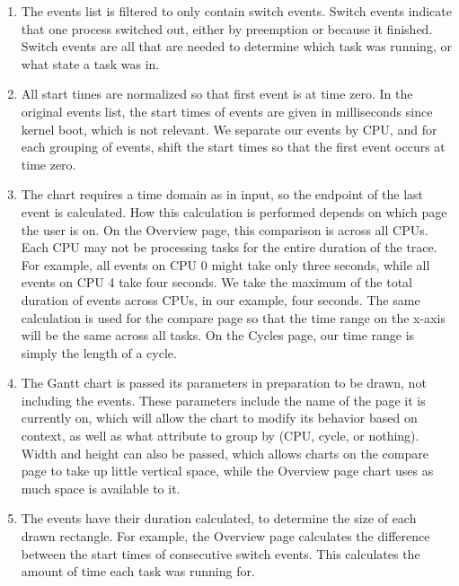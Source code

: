 \documentclass{hmcclinic}
\begin{document}
  \begin{enumerate}

    \item The events list is filtered to only contain switch events. Switch
      events indicate that one process switched out, either by preemption or
      because it finished.
      Switch events are all that are needed to determine which task was running, or
      what state a task was in.
  
    \item All start times are normalized so that first event is at time zero.
      In the original events list, the start times of events are given in
      milliseconds since kernel boot, which is not relevant. We separate our
      events by CPU, and for each grouping of events, shift the start times
      so that the first event occurs at time zero.
  
    \item The chart requires a time domain as in input, so the endpoint of the
      last event is calculated.
      How this calculation is performed depends on which page the user is
      on. On the Overview page, this comparison is across all CPUs. Each CPU may not
      be processing tasks for the entire duration of the trace. For example, all
      events on CPU 0 might take only three seconds, while all events on CPU 4 take
      four seconds. We take the maximum of the total duration of events across CPUs, in our
      example, four seconds. The same calculation is used for the compare page so
      that the time range on the x-axis will be the same across all tasks.  On
      the Cycles page, our time range is simply the length of a cycle.
  
    \item The Gantt chart is passed its parameters in preparation to be drawn,
      not including the events. These parameters include the name of the page it
      is currently on, which will allow the chart to modify its behavior based on
      context, as well as what attribute to group by (CPU, cycle, or nothing).
      Width and height can also be passed, which allows charts on the compare
      page to take up little vertical space, while the Overview page chart uses
      as much space is available to it.
  
   \item The events have their duration calculated, to determine the size of
     each drawn
     rectangle. For example, the Overview page calculates the
     difference between the start times of consecutive switch events. This
     calculates the amount of time each task was running for.
  

\end{enumerate}
\end{document}
